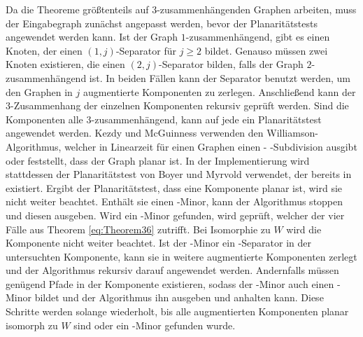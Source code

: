 Da die Theoreme größtenteils auf $3$-zusammenhängenden Graphen arbeiten, muss der Eingabegraph \ggf zunächst angepasst werden, bevor der Planaritätstests angewendet werden kann.
Ist der Graph $1$-zusammenhängend, gibt es einen Knoten, der einen $(1, j)$-Separator für $j \geq 2$ bildet.
Genauso müssen zwei Knoten existieren, die einen $(2, j)$-Separator bilden, falls der Graph $2$-zusammenhängend ist.
In beiden Fällen kann der Separator benutzt werden, um den Graphen in $j$ augmentierte Komponenten zu zerlegen.
Anschließend kann der $3$-Zusammenhang der einzelnen Komponenten rekursiv geprüft werden.
Sind die Komponenten alle $3$-zusammenhängend, kann auf jede ein Planaritätstest angewendet werden.
Kezdy und McGuinness verwenden den Williamson-Algorithmus\cite{Wil84}, welcher in Linearzeit für einen Graphen einen \kf- \bzw \kdd-Subdivision ausgibt oder feststellt, dass der Graph planar ist.
In der Implementierung wird stattdessen der Planaritätstest von Boyer und Myrvold\cite{BoM04} verwendet, der bereits in \OGDF existiert.
Ergibt der Planaritätstest, dass eine Komponente planar ist, wird sie nicht weiter beachtet.
Enthält sie einen \kf-Minor, kann der Algorithmus stoppen und diesen ausgeben.
Wird ein \kdd-Minor gefunden, wird geprüft, welcher der vier Fälle aus Theorem \ref{eq:Theorem36} zutrifft.
Bei Isomorphie zu $W$ wird die Komponente nicht weiter beachtet.
Ist der \kdd-Minor ein \dd-Separator in der untersuchten Komponente, kann sie in weitere augmentierte Komponenten zerlegt und der Algorithmus rekursiv darauf angewendet werden.
Andernfalls müssen genügend Pfade in der Komponente existieren, sodass der \kdd-Minor auch einen \kf-Minor bildet und der Algorithmus ihn ausgeben und anhalten kann.
Diese Schritte werden solange wiederholt, bis alle augmentierten Komponenten planar \bzw isomorph zu $W$ sind oder ein \kf-Minor gefunden wurde.

